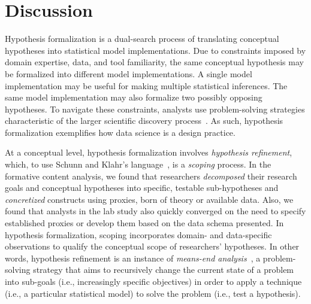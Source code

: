 \section{Discussion} \label{sec:discussionHypoForm}
Hypothesis formalization is a dual-search process of translating conceptual
hypotheses into statistical model implementations. Due to constraints imposed by
domain expertise, data, and tool familiarity, the same conceptual hypothesis may
be formalized into different model implementations. A single model implementation may be useful for making multiple statistical inferences. The same model
implementation may also formalize two possibly opposing hypotheses. To navigate
these constraints, analysts use problem-solving strategies characteristic of the
larger scientific discovery process~\cite{klahr1988dual,schunn1995FourSpace}. As
such, hypothesis formalization exemplifies how data science is a design
practice. 
 
At a conceptual level, hypothesis formalization involves \textit{hypothesis
refinement}, which, to use Schunn and Klahr's
language~\cite{schunn1995FourSpace}, is a \textit{scoping} process. In the
formative content analysis, we found that researchers \textit{decomposed} their
research goals and conceptual hypotheses into specific, testable sub-hypotheses
and \textit{concretized} constructs using proxies, born of theory or available
data. Also, we found that analysts in the lab study also quickly converged on
the need to specify established proxies or develop them based on the data schema
presented. In hypothesis formalization, scoping incorporates domain- and
data-specific observations to qualify the conceptual scope of researchers'
hypotheses. In other words, hypothesis refinement is an instance of
\textit{means-end analysis}~\cite{newell1972humanProblemSolving}, a
problem-solving strategy that aims to recursively change the current state of a
problem into sub-goals (i.e., increasingly specific objectives) in order to
apply a technique (i.e., a particular statistical model) to solve the problem
(i.e., test a hypothesis). 

